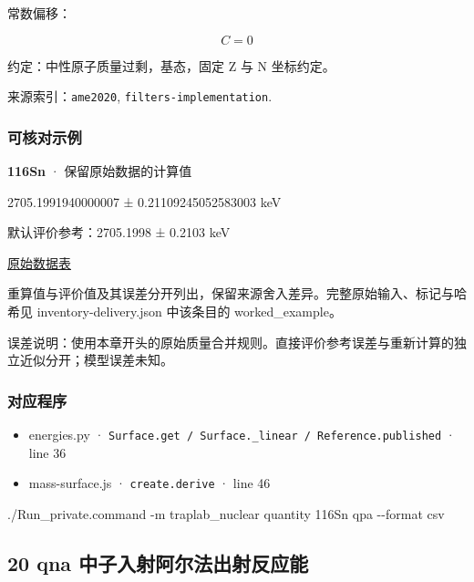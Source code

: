 \documentclass[
  11pt,
  letterpaper,
]{article}
\newenvironment{Shaded}{}{}
\newcommand{\AttributeTok}[1]{\textcolor[rgb]{0.49,0.56,0.16}{#1}}
\newcommand{\ExtensionTok}[1]{#1}
\newcommand{\NormalTok}[1]{#1}
\providecommand{\tightlist}{%
  \setlength{\itemsep}{0pt}\setlength{\parskip}{0pt}}
\begin{document}
常数偏移：

\[
C=0
\]

约定：中性原子质量过剩，基态，固定 Z 与 N 坐标约定。

来源索引：\texttt{ame2020}, \texttt{filters-implementation}.

\subsubsection{可核对示例}\label{ux53efux6838ux5bf9ux793aux4f8b-18}

\textbf{116Sn} · 保留原始数据的计算值

2705.1991940000007 ± 0.21109245052583003 keV

默认评价参考：2705.1998 ± 0.2103 keV

\href{https://www-nds.iaea.org/amdc/ame2020/rct2_1.mas20.txt}{原始数据表}

重算值与评价值及其误差分开列出，保留来源舍入差异。完整原始输入、标记与哈希见
inventory-delivery.json 中该条目的 worked\_example。

误差说明：使用本章开头的原始质量合并规则。直接评价参考误差与重新计算的独立近似分开；模型误差未知。

\subsubsection{对应程序}\label{ux5bf9ux5e94ux7a0bux5e8f-18}

\begin{itemize}
\tightlist
\item
  energies.py ·
  \texttt{Surface.get\ /\ Surface.\_linear\ /\ Reference.published} ·
  line 36
\item
  mass-surface.js · \texttt{create.derive} · line 46
\end{itemize}

\begin{Shaded}
\begin{Highlighting}[]
\ExtensionTok{./Run\_private.command} \AttributeTok{{-}m}\NormalTok{ traplab\_nuclear quantity 116Sn qpa }\AttributeTok{{-}{-}format}\NormalTok{ csv}
\end{Highlighting}
\end{Shaded}

\subsection{20 qna
中子入射阿尔法出射反应能}\label{qna-ux4e2dux5b50ux5165ux5c04ux963fux5c14ux6cd5ux51faux5c04ux53cdux5e94ux80fd}
\end{document}
